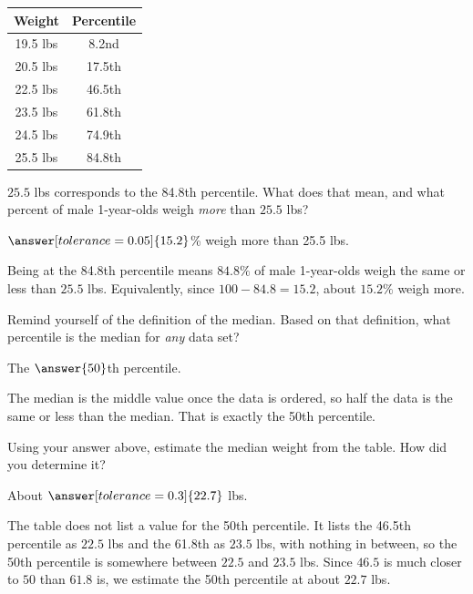 \documentclass[12pt]{ximera}
\begin{document}
\begin{center}
\begin{tabular}{|c|c|}
\hline
Weight & Percentile \\
\hline
19.5 lbs & 8.2nd \\
\hline
20.5 lbs & 17.5th \\
\hline
22.5 lbs & 46.5th \\
\hline
23.5 lbs & 61.8th \\
\hline
24.5 lbs & 74.9th \\
\hline
25.5 lbs & 84.8th \\
\hline
\end{tabular}
\end{center}

\begin{problem}
$25.5$ lbs corresponds to the 84.8th percentile. What does that mean, and what
percent of male 1-year-olds weigh \emph{more} than $25.5$ lbs?

$\answer[tolerance=0.05]{15.2}$\% weigh more than 25.5 lbs.

\begin{solution}
Being at the 84.8th percentile means $84.8\%$ of male 1-year-olds weigh the same or
less than $25.5$ lbs. Equivalently, since $100 - 84.8 = 15.2$, about $15.2\%$ weigh
more.
\end{solution}
\end{problem}

\begin{problem}
Remind yourself of the definition of the median. Based on that definition, what
percentile is the median for \emph{any} data set?

The $\answer{50}$th percentile.

\begin{solution}
The median is the middle value once the data is ordered, so half the data is the same
or less than the median. That is exactly the 50th percentile.
\end{solution}
\end{problem}

\begin{problem}
Using your answer above, estimate the median weight from the table. How did you
determine it?

About $\answer[tolerance=0.3]{22.7}$ lbs.

\begin{freeResponse}
\end{freeResponse}

\begin{solution}
The table does not list a value for the 50th percentile. It lists the 46.5th
percentile as $22.5$ lbs and the 61.8th as $23.5$ lbs, with nothing in between, so
the 50th percentile is somewhere between $22.5$ and $23.5$ lbs. Since $46.5$ is much
closer to $50$ than $61.8$ is, we estimate the 50th percentile at about $22.7$ lbs.
\end{solution}
\end{problem}
\end{document}
